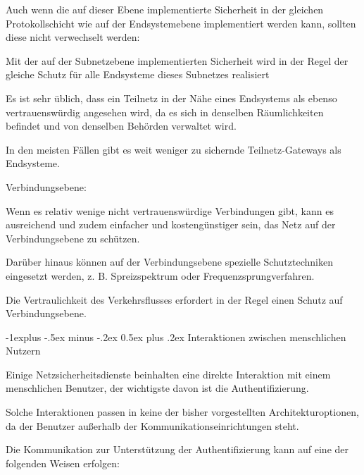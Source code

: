 \documentclass[a4paper]{article}
\makeatletter
\renewcommand{\subsection}{\@startsection{subsection}{2}{0mm}%
 {-1explus -.5ex minus -.2ex}%
 {0.5ex plus .2ex}%
 {\normalfont\normalsize\bfseries}}
\makeatother
\begin{document}
\begin{multicols}{3}
\begin{itemize*}
            \begin{itemize*}
                  \item Auch wenn die auf dieser Ebene implementierte Sicherheit in der gleichen Protokollschicht wie auf der Endsystemebene implementiert werden kann, sollten diese nicht verwechselt werden:
                  \begin{itemize*} \item Mit der auf der Subnetzebene implementierten Sicherheit wird in der Regel der gleiche Schutz für alle Endsysteme dieses Subnetzes realisiert \end{itemize*}
                  \item Es ist sehr üblich, dass ein Teilnetz in der Nähe eines Endsystems als ebenso vertrauenswürdig angesehen wird, da es sich in denselben Räumlichkeiten befindet und von denselben Behörden verwaltet wird.
                  \item In den meisten Fällen gibt es weit weniger zu sichernde Teilnetz-Gateways als Endsysteme.
            \end{itemize*}
            \item
            Verbindungsebene:

            \begin{itemize*}
                  \item Wenn es relativ wenige nicht vertrauenswürdige Verbindungen gibt, kann es ausreichend und zudem einfacher und kostengünstiger sein, das Netz auf der Verbindungsebene zu schützen.
                  \item Darüber hinaus können auf der Verbindungsebene spezielle Schutztechniken eingesetzt werden, z. B. Spreizspektrum oder Frequenzsprungverfahren.
                  \item Die Vertraulichkeit des Verkehrsflusses erfordert in der Regel einen Schutz auf Verbindungsebene.
            \end{itemize*}
      \end{itemize*}


      \subsection{Interaktionen zwischen menschlichen
            Nutzern}

      \begin{itemize*}
            \item
            Einige Netzsicherheitsdienste beinhalten eine direkte Interaktion mit
            einem menschlichen Benutzer, der wichtigste davon ist die
            Authentifizierung.
            \item
            Solche Interaktionen passen in keine der bisher vorgestellten
            Architekturoptionen, da der Benutzer außerhalb der
            Kommunikationseinrichtungen steht.
            \item
            Die Kommunikation zur Unterstützung der Authentifizierung kann auf
            eine der folgenden Weisen erfolgen:


\end{itemize*}
\end{multicols}
\end{document}
